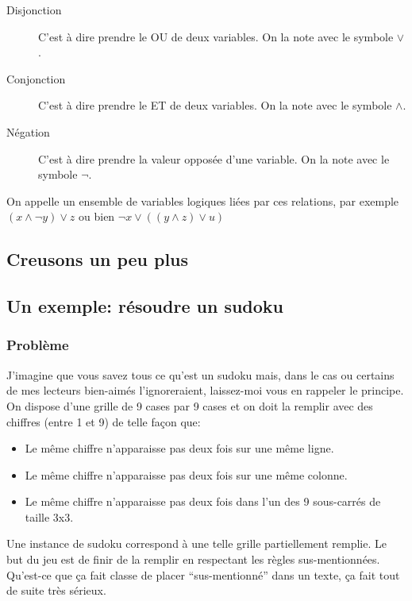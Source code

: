 \begin{description}
  \item[Disjonction]
    C'est à dire prendre le OU de deux
    variables. On la note avec le symbole $\lor$.
  \item[Conjonction]
    C'est à dire prendre le ET de deux
    variables. On la note avec le symbole $\land$.
  \item[Négation]
    C'est à dire prendre la valeur opposée d'une
    variable. On la note avec le symbole $\neg$.
\end{description}

On appelle  un ensemble de variables logiques
liées par ces relations, par exemple $(x \land \neg y) \lor z$ ou bien
$\neg x \lor ((y \land z) \lor u)$

\subsection{Creusons un peu plus}


\subsection{Un exemple: résoudre un sudoku}

\subsubsection{Problème}

J'imagine que vous savez tous ce qu'est un sudoku mais, dans le cas
ou certains de mes lecteurs bien-aimés l'ignoreraient, laissez-moi
vous en rappeler le principe. On dispose d'une grille de 9 cases par 9
cases et on doit la remplir avec des chiffres (entre 1 et 9) de telle
façon que:
\begin{itemize}
  \item Le même chiffre n'apparaisse pas deux fois sur une même ligne.
  \item Le même chiffre n'apparaisse pas deux fois sur une même
    colonne.
  \item Le même chiffre n'apparaisse pas deux fois dans l'un des 9
    sous-carrés de taille 3x3.
\end{itemize}
Une instance de sudoku correspond à une telle grille partiellement
remplie. Le but du jeu est de finir de la remplir en respectant les
règles sus-mentionnées. Qu'est-ce que ça fait classe de placer
``sus-mentionné'' dans un texte, ça fait tout de suite très sérieux.

